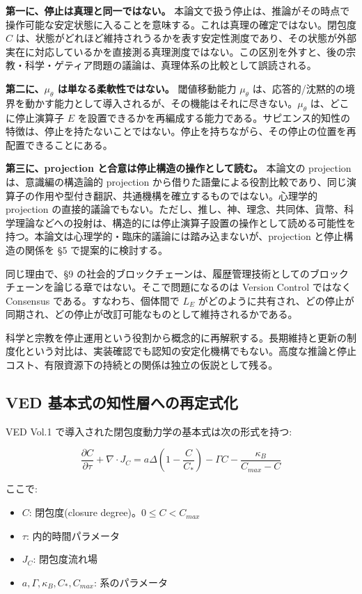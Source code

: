 \textbf{第一に、停止は真理と同一ではない。}
本論文で扱う停止は、推論がその時点で操作可能な安定状態に入ることを意味する。これは真理の確定ではない。閉包度 $C$ は、状態がどれほど維持されうるかを表す安定性測度であり、その状態が外部実在に対応しているかを直接測る真理測度ではない。この区別を外すと、後の宗教・科学・ゲティア問題の議論は、真理体系の比較として誤読される。

\textbf{第二に、$\mu_\theta$ は単なる柔軟性ではない。}
閾値移動能力 $\mu_\theta$ は、応答的/沈黙的の境界を動かす能力として導入されるが、その機能はそれに尽きない。$\mu_\theta$ は、どこに停止演算子 $E$ を設置できるかを再編成する能力である。サピエンス的知性の特徴は、停止を持たないことではない。停止を持ちながら、その停止の位置を再配置できることにある。

\textbf{第三に、projection と合意は停止構造の操作として読む。}
本論文の projection は、意識編の構造論的 projection から借りた語彙による役割比較であり、同じ演算子の作用や型付き翻訳、共通機構を確立するものではない。心理学的 projection の直接的議論でもない。ただし、推し、神、理念、共同体、貨幣、科学理論などへの投射は、構造的には停止演算子設置の操作として読める可能性を持つ。本論文は心理学的・臨床的議論には踏み込まないが、projection と停止構造の関係を \S{}5 で提案的に検討する。

同じ理由で、\S{}9 の社会的ブロックチェーンは、履歴管理技術としてのブロックチェーンを論じる章ではない。そこで問題になるのは Version Control ではなく Consensus である。すなわち、個体間で $L_E$ がどのように共有され、どの停止が同期され、どの停止が改訂可能なものとして維持されるかである。

科学と宗教を停止運用という役割から概念的に再解釈する。長期維持と更新の制度化という対比は、実装確認でも認知の安定化機構でもない。高度な推論と停止コスト、有限資源下の持続との関係は独立の仮説として残る。

\bigskip


\subsection{VED 基本式の知性層への再定式化}


VED Vol.1 で導入された閉包度動力学の基本式は次の形式を持つ:

\[
\frac{\partial C}{\partial \tau} + \nabla \cdot J_C = a\Delta\left(1 - \frac{C}{C_*}\right) - \Gamma C - \frac{\kappa_B}{C_{max} - C}
\]

ここで:
\begin{itemize}
\item $C$: 閉包度(closure degree)。$0 \le C < C_{max}$
\item $\tau$: 内的時間パラメータ
\item $J_C$: 閉包度流れ場
\item $a, \Gamma, \kappa_B, C_*, C_{max}$: 系のパラメータ
\end{itemize}


